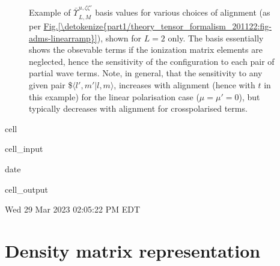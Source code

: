 \documentclass[letterpaper,table,10pt,english]{jupyterBook}
\begin{document}
\begin{figure}[htbp]
\centering
\capstart

\noindent{}
\caption{Example of \(\bar{\varUpsilon_{}}_{L,M}^{u,\zeta\zeta'}\) basis values for various choices of alignment (as per \hyperref[\detokenize{part1/theory_tensor_formalism_201122:fig-adms-linearramp}]{Fig.\@ \ref{\detokenize{part1/theory_tensor_formalism_201122:fig-adms-linearramp}}}), shown for \(L=2\) only. The basis essentially shows the obsevable terms if the ionization matrix elements are neglected, hence the sensitivity of the configuration to each pair of partial wave terms. Note, in general, that the sensitivity to any given pair \$\(\langle l',m'|l,m\rangle\), increases with alignment (hence with \(t\) in this example) for the linear polarisation case (\(\mu=\mu'=0\)), but typically decreases with alignment for cross\sphinxhyphen{}polarised terms.}\label{\detokenize{part1/theory_tensor_formalism_201122:fig-channelfunc-linearramp}}\end{figure}

\begin{sphinxuseclass}{cell}\begin{sphinxVerbatimInput}

\begin{sphinxuseclass}{cell_input}
\begin{sphinxVerbatim}[commandchars=\\\{\}]
date
\end{sphinxVerbatim}

\end{sphinxuseclass}\end{sphinxVerbatimInput}
\begin{sphinxVerbatimOutput}

\begin{sphinxuseclass}{cell_output}
\begin{sphinxVerbatim}[commandchars=\\\{\}]
Wed 29 Mar 2023 02:05:22 PM EDT
\end{sphinxVerbatim}

\end{sphinxuseclass}\end{sphinxVerbatimOutput}

\end{sphinxuseclass}
\sphinxstepscope


\section{Density matrix representation}
\label{\detokenize{part1/theory_density_matrices_310123:density-matrix-representation}}\label{\detokenize{part1/theory_density_matrices_310123:sec-density-mat-basic}}\label{\detokenize{part1/theory_density_matrices_310123::doc}}
\end{document}
